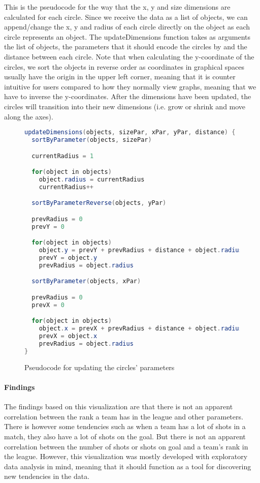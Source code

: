 \documentclass[Report.tex]{subfiles}
\begin{document}
\noindent This is the pseudocode for the way that the x, y and size dimensions are calculated for each circle.
Since we receive the data as a list of objects, we can append/change the x, y and radius of each circle directly on the object as each circle represents an object. The updateDimensions function takes as arguments the list of objects, the parameters that it should encode the circles by and the distance between each circle. Note that when calculating the y-coordinate of the circles, we sort the objects in reverse order as coordinates in graphical spaces usually have the origin in the upper left corner, meaning that it is counter intuitive for users compared to how they normally view graphs, meaning that we have to inverse the y-coordinates. After the dimensions have been updated, the circles will transition into their new dimensions (i.e. grow or shrink and move along the axes).

\begin{figure}
\begin{lstlisting}[language=java]
updateDimensions(objects, sizePar, xPar, yPar, distance) {
  sortByParameter(objects, sizePar)

  currentRadius = 1

  for(object in objects)
    object.radius = currentRadius
    currentRadius++

  sortByParameterReverse(objects, yPar)

  prevRadius = 0
  prevY = 0

  for(object in objects)
    object.y = prevY + prevRadius + distance + object.radius
    prevY = object.y
    prevRadius = object.radius

  sortByParameter(objects, xPar)

  prevRadius = 0
  prevX = 0

  for(object in objects)
    object.x = prevX + prevRadius + distance + object.radius
    prevX = object.x
    prevRadius = object.radius
}
\end{lstlisting}
\caption{Pseudocode for updating the circles' parameters}
\end{figure}

\paragraph{Findings\\}
The findings based on this visualization are that there is not an apparent correlation between the rank a team has in the league and other parameters. There is however some tendencies such as when a team has a lot of shots in a match, they also have a lot of shots on the goal. But there is not an apparent correlation between the number of shots or shots on goal and a team's rank in the league. However, this visualization was mostly developed with exploratory data analysis in mind, meaning that it should function as a tool for discovering new tendencies in the data.
\end{document}

